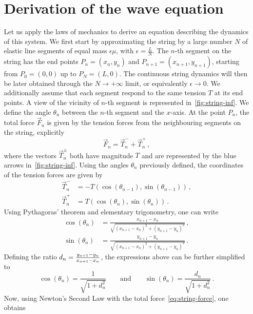 \section{Derivation of the wave equation}
Let us apply the laws of mechanics to derive an equation describing the dynamics of this
system. We first start by approximating the string by a large number $N$ of elastic line
segments of equal mass $\epsilon\mu$, with $\epsilon=\frac{L}{N}$. The $n$-th segment on
the string has the end points $P_n=(x_n,y_n)$ and $P_{n+1}=(x_{n+1},y_{n+1})$, starting
from $P_0=(0,0)$ up to $P_N=(L,0)$. The continuous string dynamics will then be later
obtained through the $N\to+\infty$ limit, or equivalently $\epsilon\to 0$. We additionally
assume that each segment respond to the same tension $T$ at its end points. A view of the
vicinity of $n$-th segment is represented in~\cref{fig:string-inf}. We define the angle
$\theta_n$ between the $n$-th segment and the $x$-axis. At the point $P_n$, the total
force $\vec{F}_n$ is given by the tension forces from the neighbouring segments on the
string, explicitly
\begin{equation}
  \vec{F}_n=\vec{T}_n^-+\vec{T}_n^+\,,\label{eq:string-force}
\end{equation}
where the vectors $\vec{T}_n^\pm$ both have magnitude $T$ and are represented by the blue
arrows in~\cref{fig:string-inf}. Using the angles $\theta_n$ previously defined, the
coordinates of the tension forces are given by
\begin{align}
  \vec{T}_n^-&=-T(\cos(\theta_{n-1}),\sin(\theta_{n-1}))\,,\label{eq:stringtm}\\
  \vec{T}_n^+&=T(\cos(\theta_{n}),\sin(\theta_{n}))\,.\label{eq:stringtp}
\end{align}
Using Pythagoras' theorem and elementary trigonometry, one can write
\begin{align}
  \cos(\theta_n)&=\frac{x_{n+1}-x_n}{\sqrt{(x_{n+1}-x_n)^2+(y_{n+1}-y_n)^2}}\,,\\
  \sin(\theta_n)&=\frac{y_{n+1}-y_n}{\sqrt{(x_{n+1}-x_n)^2+(y_{n+1}-y_n)^2}}\,.
\end{align}
Defining the ratio $d_n=\smash{\frac{y_{n+1}-y_n}{x_{n+1}-x_n}}$, the expressions above
can be further simplified to
\begin{equation}
  \cos(\theta_n)=\frac{1}{\sqrt{1+d_n^2}}\qquad\text{and}\qquad
  \sin(\theta_n)=\frac{d_n}{\sqrt{1+d_n^2}}\,.\label{eq:csthetan}
\end{equation}
Now, using Newton's Second Law with the total force~\cref{eq:string-force}, one obtains
